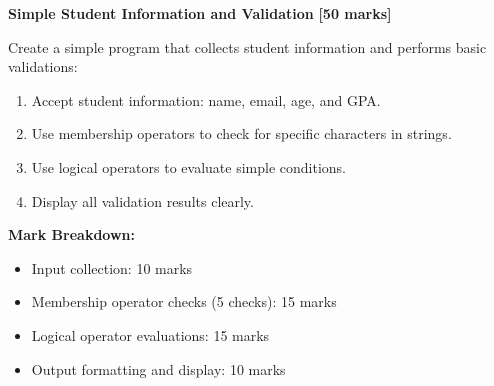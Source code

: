 \documentclass[a4paper,11pt]{article}
\theoremstyle{mytheor}
\begin{document}
\newpage

    \item \textbf{Simple Student Information and Validation} \hfill \textbf{[50 marks]}
    
    Create a simple program that collects student information and performs basic validations:
    
    \begin{enumerate} 
        \item Accept student information: name, email, age, and GPA.
        \item Use membership operators to check for specific characters in strings.
        \item Use logical operators to evaluate simple conditions.
        \item Display all validation results clearly.
    \end{enumerate}
    
    \textbf{Mark Breakdown:}
    \begin{itemize}
        \item Input collection: 10 marks
        \item Membership operator checks (5 checks): 15 marks
        \item Logical operator evaluations: 15 marks
        \item Output formatting and display: 10 marks
    \end{itemize}
    
\end{document}
